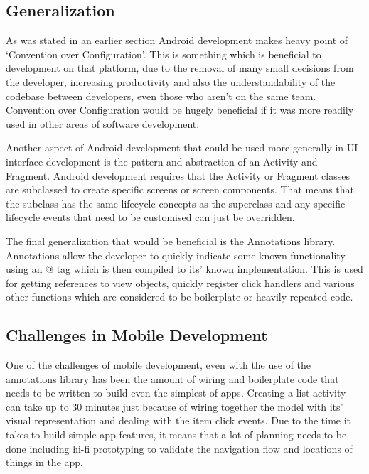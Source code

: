 \documentclass[11pt,english,numbers=endperiod,parskip=half]{scrartcl}
\begin{document}
  \subsection{Generalization}
    As was stated in an earlier section Android development makes heavy point of
    `Convention over Configuration'. This is something which is beneficial to
    development on that platform, due to the removal of many small decisions
    from the developer, increasing productivity and also the understandability
    of the codebase between developers, even those who aren't on the same team.
    Convention over Configuration would be hugely beneficial if it was more
    readily used in other areas of software development.

    Another aspect of Android development that could be used more generally in
    UI interface development is the pattern and abstraction of an Activity and
    Fragment. Android development requires that the Activity or Fragment classes
    are subclassed to create specific screens or screen components. That means
    that the subclass has the same lifecycle concepts as the superclass and
    any specific lifecycle events that need to be customised can just be
    overridden.

    The final generalization that would be beneficial is the Annotations library.
    Annotations allow the developer to quickly indicate some known functionality
    using an @ tag which is then compiled to its' known implementation. This is
    used for getting references to view objects, quickly register click handlers
    and various other functions which are considered to be boilerplate or
    heavily repeated code.

  \subsection{Challenges in Mobile Development}
    One of the challenges of mobile development, even with the use of the
    annotations library has been the amount of wiring and boilerplate code that
    needs to be written to build even the simplest of apps. Creating a list
    activity can take up to 30 minutes just because of wiring together the model
    with its' visual representation and dealing with the item click events.
    Due to the time it takes to build simple app features, it means that a lot
    of planning needs to be done including hi-fi prototyping to validate the
    navigation flow and locations of things in the app.
\end{document}
